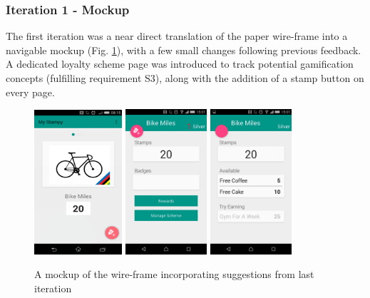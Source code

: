 \subsubsection{Iteration 1 - Mockup}
The first iteration was a near direct translation of the paper wire-frame into a navigable mockup (Fig. \ref{fig:wireframe2}), with a few small changes following previous feedback. A dedicated loyalty scheme page was introduced to track potential gamification concepts (fulfilling requirement S3), along with the addition of a stamp button on every page.
\begin{figure}[H]
 \centering
  \includegraphics[width=0.29\textwidth]{img/MainMockup.png}
   \includegraphics[width=0.27\textwidth]{img/firstiteration1.png}
    \includegraphics[width=0.27\textwidth]{img/firstiteration2.png}
    \caption{A mockup of the wire-frame incorporating suggestions from last iteration}
	\label{fig:wireframe2}
\end{figure}


